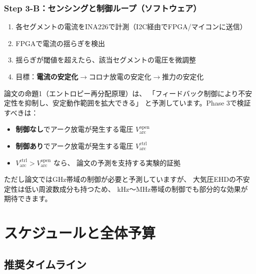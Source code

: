 \documentclass[12pt,a4paper]{ltjsarticle}
\begin{document}
\subsubsection{Step 3-B：センシングと制御ループ（ソフトウェア）}

\begin{enumerate}[leftmargin=2em]
  \item 各セグメントの電流をINA226で計測（I2C経由でFPGA/マイコンに送信）
  \item FPGAで電流の揺らぎを検出
  \item 揺らぎが閾値を超えたら、該当セグメントの電圧を微調整
  \item 目標：\textbf{電流の安定化}$\to$コロナ放電の安定化$\to$推力の安定化
\end{enumerate}

\begin{infobox}[title={論文との対応}]
論文の命題1（エントロピー再分配原理）は、
「フィードバック制御により不安定性を抑制し、安定動作範囲を拡大できる」
と予測しています。Phase 3で検証すべきは：

\begin{itemize}[leftmargin=2em]
  \item \textbf{制御なし}でアーク放電が発生する電圧 $V_{\mathrm{arc}}^{\mathrm{open}}$
  \item \textbf{制御あり}でアーク放電が発生する電圧 $V_{\mathrm{arc}}^{\mathrm{ctrl}}$
  \item $V_{\mathrm{arc}}^{\mathrm{ctrl}} > V_{\mathrm{arc}}^{\mathrm{open}}$ なら、
        論文の予測を支持する実験的証拠
\end{itemize}

ただし論文ではGHz帯域の制御が必要と予測していますが、
大気圧EHDの不安定性は低い周波数成分も持つため、
kHz〜MHz帯域の制御でも部分的な効果が期待できます。
\end{infobox}

\newpage
\section{スケジュールと全体予算}

\subsection{推奨タイムライン}
\end{document}
